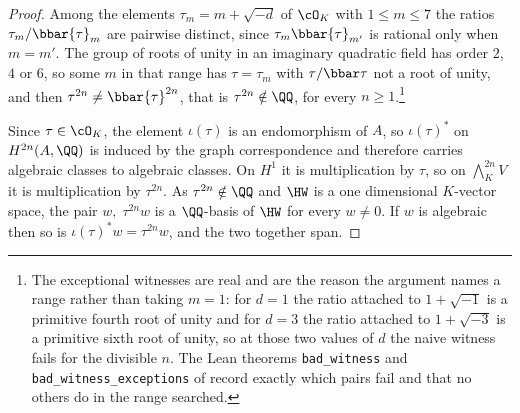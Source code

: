 \begin{proof}
Among the elements $\tau_{m}=m+\sqrt{-d}$ of $\cO_{K}$ with $1\le m\le7$ the
ratios $\tau_{m}/\bbar{\tau}_{m}$ are pairwise distinct, since
$\tau_{m}\bbar{\tau}_{m'}$ is rational only when $m=m'$. The group of roots of
unity in an imaginary quadratic field has order $2$, $4$ or $6$, so some $m$
in that range has $\tau=\tau_{m}$ with $\tau/\bbar\tau$ not a root of unity,
and then $\tau^{2n}\ne\bbar{\tau}^{2n}$, that is $\tau^{2n}\notin\QQ$, for
every $n\ge1$.\footnote{The exceptional witnesses are real and are the reason
the argument names a range rather than taking $m=1$: for $d=1$ the ratio
attached to $1+\sqrt{-1}$ is a primitive fourth root of unity and for $d=3$
the ratio attached to $1+\sqrt{-3}$ is a primitive sixth root of unity, so at
those two values of $d$ the naive witness fails for the divisible $n$. The
Lean theorems \texttt{bad\_witness} and \texttt{bad\_witness\_exceptions} of
 record exactly which pairs fail and that no others do in the
range searched.}

Since $\tau\in\cO_{K}$, the element $\iota(\tau)$ is an endomorphism of $A$,
so $\iota(\tau)^{*}$ on $H^{2n}(A,\QQ)$ is induced by the graph
correspondence and therefore carries algebraic classes to algebraic classes.
On $H^{1}$ it is multiplication by $\tau$, so on
$\bigwedge^{2n}_{K}V$ it is multiplication by $\tau^{2n}$. As
$\tau^{2n}\notin\QQ$ and $\HW$ is a one dimensional $K$-vector space, the pair
$w,\;\tau^{2n}w$ is a $\QQ$-basis of $\HW$ for every $w\ne0$. If $w$ is
algebraic then so is $\iota(\tau)^{*}w=\tau^{2n}w$, and the two together span.
\end{proof}


